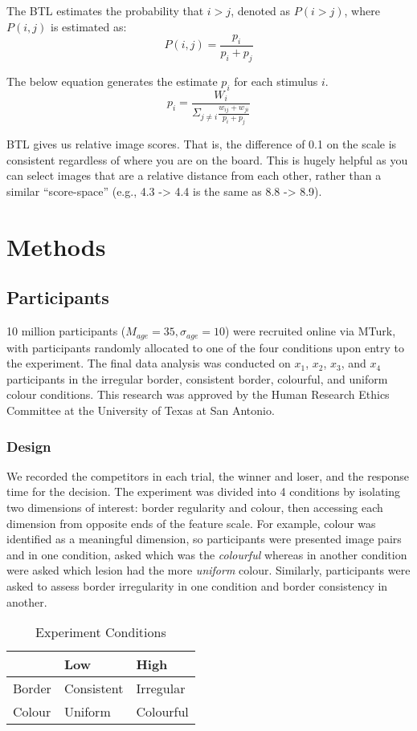 \documentclass[a4paper, natbib, doc, 12pt]{apa7}
\begin{document}
The BTL estimates the probability that $i > j$, denoted as $P(i>j)$, where $P(i,j)$ is estimated as: 
\begin{equation}
    P(i, j) = \frac{p_{i}}{p_{i} + p_{j}}
\end{equation}

The below equation generates the estimate $p_{i}$ for each stimulus $i$.
\begin{equation}
    p_{i} = \frac{W_{i}}{\Sigma_{j\neq i}\frac{w_{ij}+w_{ji}}{p_{i}+p_{j}}}
\end{equation}

BTL gives us relative image scores. That is, the difference of 0.1 on the scale is consistent regardless of where you are on the board. This is hugely helpful as you can select images that are a relative distance from each other, rather than a similar ``score-space'' (e.g., 4.3 -> 4.4 is the same as 8.8 -> 8.9).

\section{Methods}
\subsection{Participants}
10 million participants ($M_{age} = 35,\sigma_{age} = 10$) were recruited online via MTurk, with participants randomly allocated to one of the four conditions upon entry to the experiment. The final data analysis was conducted on $x_{1}$, $x_{2}$, $x_{3}$, and $x_{4}$ participants in the irregular border, consistent border, colourful, and uniform colour conditions. This research was approved by the Human Research Ethics Committee at the University of Texas at San Antonio.

\subsubsection{Design}
We recorded the competitors in each trial, the winner and loser, and the response time for the decision. The experiment was divided into 4 conditions by isolating two dimensions of interest: border regularity and colour, then accessing each dimension from opposite ends of the feature scale. For example, colour was identified as a meaningful dimension, so participants were presented image pairs and in one condition, asked which was the \textit{colourful} whereas in another condition were asked which lesion had the more \textit{uniform} colour. Similarly, participants were asked to assess border irregularity in one condition and border consistency in another.
\begin{table}[!htp]
\centering
\caption{Experiment Conditions}
\begin{tabular}{lll}
 & Low & High \\ \hline
\multicolumn{1}{l|}{Border} & Consistent & Irregular \\
\multicolumn{1}{l|}{Colour} & Uniform & Colourful
\end{tabular}
\end{table}
\end{document}
